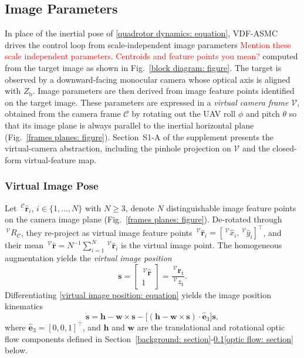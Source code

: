 \subsection{Image Parameters} \label{image parameters: section}
In place of the inertial pose of \eqref{quadrotor dynamics: equation}, VDF-ASMC drives the control loop from scale-independent image parameters \textcolor{red}{ Mention these scale independent parameters. Centroids and feature points you mean?} computed from the target image as shown in Fig.~\ref{block diagram: figure}. The target is observed by a downward-facing monocular camera whose optical axis is aligned with $Z_\text{b}$. Image parameters are then derived from image feature points identified on the target image. These parameters are expressed in a \emph{virtual camera frame} $\mathcal{V}$, obtained from the camera frame $\mathcal{C}$ by rotating out the UAV roll $\phi$ and pitch $\theta$ so that its image plane is always parallel to the inertial horizontal plane (Fig.~\ref{frames planes: figure}). Section~S1-A of the supplement presents the virtual-camera abstraction, including the pinhole projection on $\mathcal{V}$ and the closed-form virtual-feature map.

\subsubsection{Virtual Image Pose} \label{virtual image pose: section}
Let $\,^\mathcal{C}\hat{\boldsymbol{r}}_i$, $i\in\{1,\dots,N\}$ with $N\ge 3$, denote $N$ distinguishable image feature points on the camera image plane (Fig.~\ref{frames planes: figure}). De-rotated through $\,^\mathcal{V}R_\mathcal{C}$, they re-project as virtual image feature points $\,^\mathcal{V}\hat{\boldsymbol{r}}_i=[\,^\mathcal{V}\hat{x}_i,\,^\mathcal{V}\hat{y}_i]^\top$, and their mean $\,^\mathcal{V}\hat{\boldsymbol{r}}=N^{-1}\sum_{i=1}^{N}\,^\mathcal{V}\hat{\boldsymbol{r}}_i$ is the virtual image point. The homogeneous augmentation yields the \emph{virtual image position}
\begin{equation} \label{virtual image position: equation}
    \boldsymbol{s} = \begin{bmatrix}\,^\mathcal{V}\hat{\boldsymbol{r}}\\ 1\end{bmatrix} = \frac{\,^\mathcal{V}\boldsymbol{r}_\text{t}}{\,^\mathcal{V}z_\text{t}}.
\end{equation}
Differentiating \eqref{virtual image position: equation} yields the image position kinematics
\begin{equation} \label{s dot: equation}
    \dot{\boldsymbol{s}} = \boldsymbol{h} - \boldsymbol{w}\times\boldsymbol{s} - \big[(\boldsymbol{h}-\boldsymbol{w}\times\boldsymbol{s})\cdot\hat{\boldsymbol{e}}_3\big]\boldsymbol{s},
\end{equation}
where $\hat{\boldsymbol{e}}_3=[0,0,1]^\top$, and $\boldsymbol{h}$ and $\boldsymbol{w}$ are the translational and rotational optic flow components defined in Section~\ref{background: section}-\ref{image parameters: section}\ref{optic flow: section} below.

